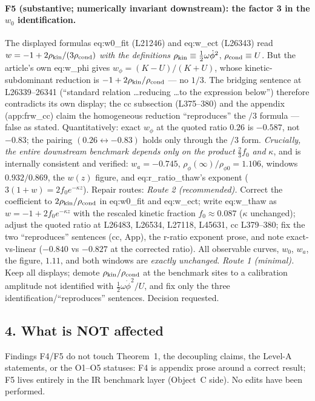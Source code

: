\paragraph{F5 (substantive; numerically invariant downstream):
the factor 3 in the $w_0$ identification.} The displayed
formulas eq:w0\_fit (L21246) and eq:w\_ect (L26343) read
$w=-1+2\rho_{\rm kin}/(3\rho_{\rm cond})$ \emph{with the
definitions} $\rho_{\rm kin}\equiv\frac12\omega\dot\phi^2$,
$\rho_{\rm cond}\equiv U$. But the article's own
eq:w\_phi gives $w_\phi=(K-U)/(K+U)$, whose
kinetic-subdominant reduction is $-1+2\rho_{\rm kin}/
\rho_{\rm cond}$ --- no $1/3$. The bridging sentence at
L26339--26341 (``standard relation \ldots reducing \ldots to the
expression below'') therefore contradicts its own display; the
cc subsection (L375--380) and the appendix (app:frw\_cc) claim
the homogeneous reduction ``reproduces'' the $/3$ formula ---
false as stated. Quantitatively: exact $w_\phi$ at the quoted
ratio $0.26$ is $-0.587$, not $-0.83$; the pairing
$(0.26\leftrightarrow-0.83)$ holds only through the $/3$ form.
\emph{Crucially, the entire downstream benchmark depends only on
the product} $\tfrac23 f_0$ \emph{and} $\kappa$, and is
internally consistent and verified: $w_a=-0.745$,
$\rho_\phi(\infty)/\rho_{\phi0}=1.106$, windows $0.932/0.869$,
the $w(z)$ figure, and eq:r\_ratio\_thaw's exponent
($3(1+w)=2f_0e^{-\kappa z}$). Repair routes:
\emph{Route 2 (recommended).} Correct the coefficient to
$2\rho_{\rm kin}/\rho_{\rm cond}$ in eq:w0\_fit and eq:w\_ect;
write eq:w\_thaw as $w=-1+2f_0e^{-\kappa z}$ with the rescaled
kinetic fraction $f_0\approx0.087$ ($\kappa$ unchanged); adjust
the quoted ratio at L26483, L26534, L27118, L45631, cc
L379--380; fix the two ``reproduces'' sentences (cc, App), the
r-ratio exponent prose, and note exact-vs-linear
($-0.840$ vs $-0.827$ at the corrected ratio). All observable
curves, $w_0$, $w_a$, the figure, $1.11$, and both windows are
\emph{exactly unchanged}.
\emph{Route 1 (minimal).} Keep all displays; demote
$\rho_{\rm kin}/\rho_{\rm cond}$ at the benchmark sites to a
calibration amplitude not identified with
$\frac12\omega\dot\phi^2/U$, and fix only the three
identification/``reproduces'' sentences. Decision requested.

\subsection*{4. What is NOT affected}
Findings F4/F5 do not touch Theorem~1, the decoupling claims,
the Level-A statements, or the O1--O5 statuses: F4 is appendix
prose around a correct result; F5 lives entirely in the IR
benchmark layer (Object~C side). No edits have been performed.

